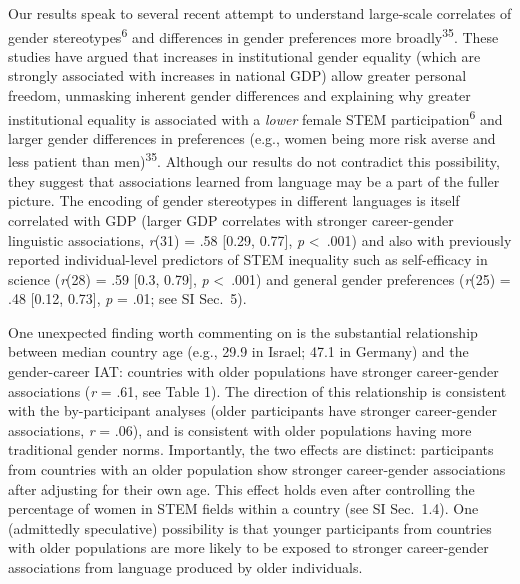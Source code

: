 \documentclass[9pt,twocolumn]{pnas-new}
\begin{document}
Our results speak to several recent attempt to understand large-scale correlates of gender stereotypes\textsuperscript{6} and differences in gender preferences more broadly\textsuperscript{35}. These studies have argued that increases in institutional gender equality (which are strongly associated with increases in national GDP) allow greater personal freedom, unmasking inherent gender differences and explaining why greater institutional equality is associated with a \textit{lower} female STEM participation\textsuperscript{6} and larger gender differences in preferences (e.g., women being more risk averse and less patient than men)\textsuperscript{35}. Although our results do not contradict this possibility, they suggest that associations learned from language may be a part of the fuller picture. The encoding of gender stereotypes in different languages is itself correlated with GDP (larger GDP correlates with stronger career-gender linguistic associations, \emph{r}(31) = .58 {[}0.29, 0.77{]}, \emph{p} \textless\ .001) and also with previously reported individual-level predictors of STEM inequality such as self-efficacy in science  (\emph{r}(28) = .59 {[}0.3, 0.79{]}, \emph{p} \textless\ .001) and general gender preferences (\emph{r}(25) = .48 {[}0.12, 0.73{]}, \emph{p} = .01; see SI Sec.\ 5). 

One unexpected finding worth commenting on is the substantial relationship between median country age (e.g., 29.9 in Israel; 47.1 in Germany) and the gender-career IAT: countries with older populations have stronger career-gender associations (\emph{r} = .61, see Table 1). The direction of this relationship is consistent with the by-participant analyses (older participants have stronger career-gender associations, \emph{r} = .06), and is consistent with older populations having more traditional gender norms. Importantly, the two effects are distinct: participants from countries with an older population show stronger career-gender associations after adjusting for their own age. This effect holds even after controlling the percentage of women in STEM fields within a country (see SI Sec.\ 1.4). One (admittedly speculative) possibility is that younger participants from countries with older populations are more likely to be exposed to stronger career-gender associations from language produced by older individuals.  
\end{document}

